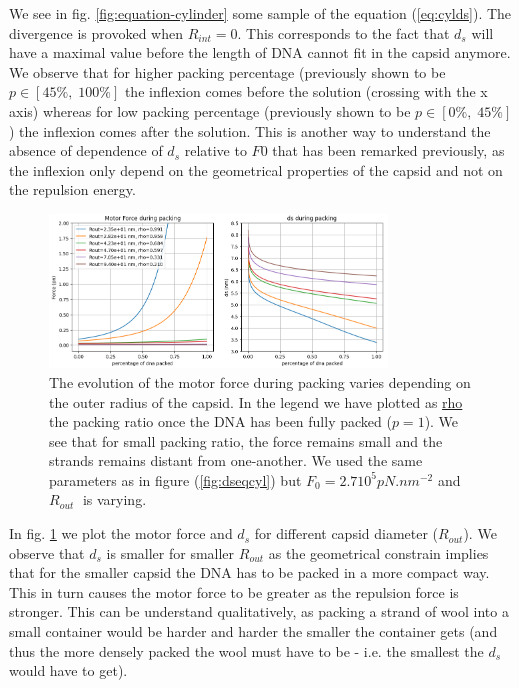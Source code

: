 \documentclass{article}
\begin{document}
We see in fig. \ref{fig:equation-cylinder} some sample of the equation (\ref{eq:cylds}). The divergence is provoked when $R_{int} = 0$. This corresponds to the fact that $d_s$ will have a maximal value before the length of DNA cannot fit in the capsid anymore. We observe that for higher packing percentage (previously shown to be $p \in \left[45\%,\;100\%\right]$ the inflexion comes before the solution (crossing with the x axis) whereas for low packing percentage (previously shown to be $p \in \left[0\%,\;45\%\right]$) the inflexion comes after the solution. This is another way to understand the absence of dependence of $d_s$ relative to $F0$ that has been remarked previously, as the inflexion only depend on the geometrical properties of the capsid and not on the repulsion energy.

\begin{figure}
    \centering
    \includegraphics[width=0.8\textwidth]{Fig_Cylinder_FR.png}
    \caption{The evolution of the motor force during packing varies depending on the outer radius of the capsid. In the legend we have plotted as \url{rho} the packing ratio once the DNA has been fully packed ($p=1$). We see that for small packing ratio, the force remains small and the strands remains distant from one-another. We used the same parameters as in figure (\ref{fig:dseqcyl}) but $F_0 = 2.710^5 pN.nm^{-2}$ and $R_{out}\;$ is varying.}
    \label{fig:cylinder-fr}
\end{figure}

In fig. \ref{fig:cylinder-fr} we plot the motor force and $d_s$ for different capsid diameter ($R_{out}$). We observe that $d_s$ is smaller for smaller $R_{out}$ as the geometrical constrain implies that for the smaller capsid the DNA has to be packed in a more compact way. This in turn causes the motor force to be greater as the repulsion force is stronger. This can be understand qualitatively, as packing a strand of wool into a small container would be harder and harder the smaller the container gets (and thus the more densely packed the wool must have to be - i.e. the smallest the $d_s$ would have to get).
\end{document}
